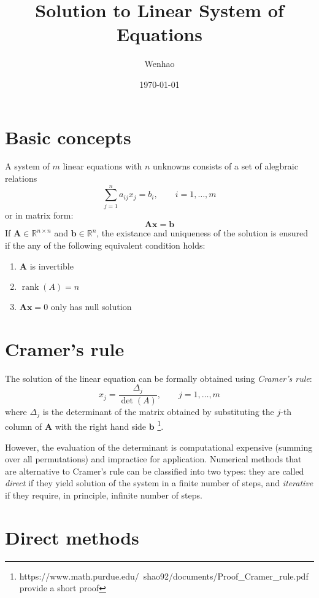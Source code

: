 \documentclass{article}
\DeclareMathOperator{\rank}{rank}
\begin{document}
\title{Solution to Linear System of Equations}
\author{Wenhao}
\date{\today}
\maketitle

\section{Basic concepts}
A system of $m$ linear equations with $n$ unknowns consists of a set of alegbraic relations
\[\sum_{j=1}^n a_{ij}x_j = b_i,\qquad i = 1, \dots, m\]
or in matrix form:
\[\mathbf{A}\mathbf{x} = \mathbf{b}\]
If $\mathbf{A}\in \mathbb{R}^{n\times n}$ and $\mathbf{b}\in \mathbb{R}^{n}$, the 
existance and uniqueness of the solution is ensured if the any of the following equivalent 
condition holds:
\begin{enumerate}
    \item $\mathbf{A}$ is invertible
    \item $\rank(A) = n$
    \item $\mathbf{A}\mathbf{x} =0$ only has null solution
\end{enumerate}

\section{Cramer's rule}
The solution of the linear equation can be formally obtained using \emph{Cramer's rule}:
\[x_j = \frac{\Delta_j}{\det(A)},\qquad j = 1, \dots, m\]
where $\Delta_j$ is the determinant of the matrix obtained by substituting the $j$-th 
column of $\mathbf{A}$ with the right hand side $\mathbf{b}$
\footnote{https://www.math.purdue.edu/~shao92/documents/Proof_Cramer_rule.pdf provide a short proof}.

However, the evaluation of the determinant is computational expensive (summing over all 
permutations) and impractice for application. Numerical methods that are alternative to 
Cramer's rule can be classified into two types:
they are called \emph{direct} if they yield solution of the system in a finite number of 
steps, and \emph{iterative} if they require, in principle, infinite number of steps.

\section{Direct methods}
\end{document}

